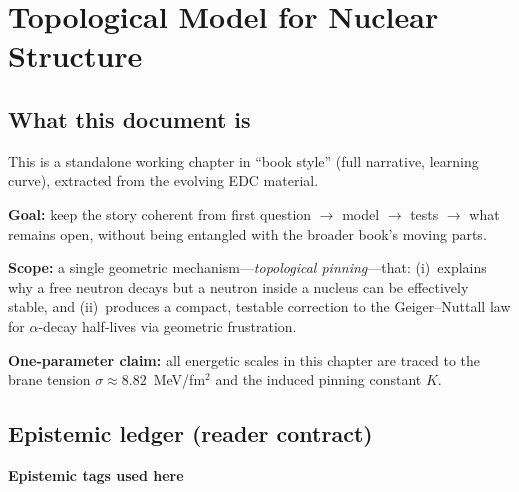 
\section{Topological Model for Nuclear Structure}
\label{sec:m6-model}

\subsection{What this document is}
\label{subsec:what-this-is}

This is a standalone working chapter in ``book style'' (full narrative, learning curve), extracted from the evolving EDC material.

\textbf{Goal:} keep the story coherent from first question $\to$ model $\to$ tests $\to$ what remains open, without being entangled with the broader book's moving parts.

\textbf{Scope:} a single geometric mechanism---\emph{topological pinning}---that: (i)~explains why a free neutron decays but a neutron inside a nucleus can be effectively stable, and (ii)~produces a compact, testable correction to the Geiger--Nuttall law for $\alpha$-decay half-lives via geometric frustration.

\textbf{One-parameter claim:} all energetic scales in this chapter are traced to the brane tension $\sigma \approx 8.82$~MeV/fm$^2$ and the induced pinning constant $K$.

\subsection{Epistemic ledger (reader contract)}
\label{subsec:epistemic-ledger}

\textbf{Epistemic tags used here}

